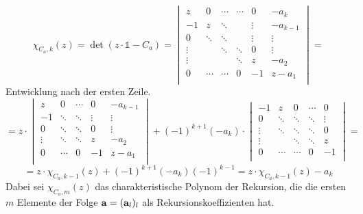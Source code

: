 \begin{flushenum}
\item
	\[ \chi_{C_a, k}(z) = \det ( z\cdot \mathds{1} - C_a) = 
		\begin{vmatrix}
			z      & 0      & \cdots & \cdots & 0      & -a_k     \\
			-1     & z      & \ddots &        & \vdots & -a_{k-1} \\
			0      & \ddots & \ddots &        & \vdots & \vdots   \\
			\vdots &        & \ddots & \ddots & 0      & \vdots   \\
			\vdots &        &        & \ddots & z      & -a_2     \\
			0      & \cdots & \cdots & 0      & -1     & z - a_1  \\
		\end{vmatrix} = \]
	Entwicklung nach der ersten Zeile.
	\[ = z \cdot \begin{vmatrix}
			z      & 0      & \cdots & 0      & -a_{k-1} \\
			-1     & \ddots & \ddots & \vdots & \vdots   \\
			0      & \ddots & \ddots & 0      & \vdots   \\
			\vdots & \ddots & \ddots & z      & -a_2     \\
			0      & \cdots & 0      & -1     & z - a_1  \\
		\end{vmatrix} + (-1)^{k+1}(-a_k) \cdot
		\begin{vmatrix}
			-1     & z      & 0      & \cdots & 0      \\
			0      & \ddots & \ddots & \ddots & \vdots \\
			\vdots & \ddots & \ddots & \ddots & 0      \\
			\vdots &        & \ddots & \ddots & z      \\
			0      & \cdots & \cdots & 0      & -1     \\
		\end{vmatrix} = \]
	\[ = z \cdot \chi_{C_a, k-1}(z) + (-1)^{k+1}(-a_k)(-1)^{k-1} = z \cdot \chi_{C_a, k-1}(z) - a_k \]
	Dabei sei $\chi_{C_a, m}(z)$ das charakteristische Polynom der
	Rekursion, die die ersten $m$ Elemente der Folge ${\bf a} = ({\bf
	a}_l)_l$ als Rekursionskoeffizienten hat.


\end{flushenum}
